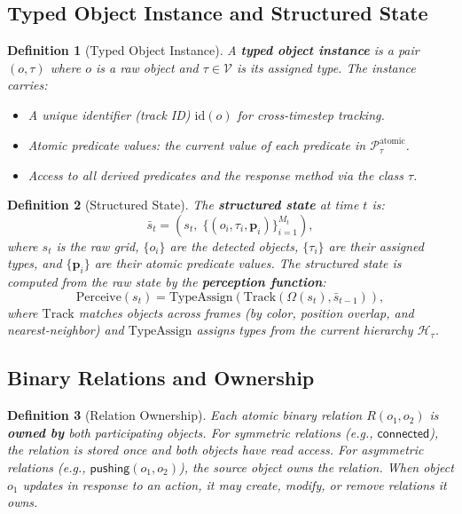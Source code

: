 \documentclass{article}
\newtheorem{definition}{Definition}
\newcommand{\calH}{\mathcal{H}}
\newcommand{\calP}{\mathcal{P}}
\newcommand{\calV}{\mathcal{V}}
\begin{document}
\subsection{Typed Object Instance and Structured State}
\label{sec:structured_state}

\begin{definition}[Typed Object Instance]
\label{def:typed_instance}
A \textbf{typed object instance} is a pair $(o, \tau)$ where $o$ is a raw
object and $\tau \in \calV$ is its assigned type.  The instance carries:
\begin{itemize}[nosep]
    \item A unique identifier (track ID) $\text{id}(o)$ for cross-timestep
          tracking.
    \item Atomic predicate values: the current value of each predicate in
          $\calP_\tau^{\text{atomic}}$.
    \item Access to all derived predicates and the response method via
          the class $\tau$.
\end{itemize}
\end{definition}

\begin{definition}[Structured State]
\label{def:structured_state}
The \textbf{structured state} at time $t$ is:
\begin{equation}
\bar{s}_t = (s_t, \; \{(o_i, \tau_i, \mathbf{p}_i)\}_{i=1}^{M_t}),
\end{equation}
where $s_t$ is the raw grid, $\{o_i\}$ are the detected objects,
$\{\tau_i\}$ are their assigned types, and $\{\mathbf{p}_i\}$ are
their atomic predicate values.  The structured state is computed from the
raw state by the \textbf{perception function}:
\begin{equation}
\text{Perceive}(s_t) = \text{TypeAssign}(\text{Track}(\Omega(s_t), \bar{s}_{t-1})),
\end{equation}
where $\text{Track}$ matches objects across frames (by color, position overlap,
and nearest-neighbor) and $\text{TypeAssign}$ assigns types from the current
hierarchy $\calH_\tau$.
\end{definition}

\subsection{Binary Relations and Ownership}
\label{sec:relations}

\begin{definition}[Relation Ownership]
\label{def:relation_ownership}
Each atomic binary relation $R(o_1, o_2)$ is \textbf{owned by} both
participating objects.  For symmetric relations (e.g., $\mathsf{connected}$),
the relation is stored once and both objects have read access.  For asymmetric
relations (e.g., $\mathsf{pushing}(o_1, o_2)$), the source object owns the
relation.  When object $o_1$ updates in response to an action, it may create,
modify, or remove relations it owns.
\end{definition}
\end{document}
